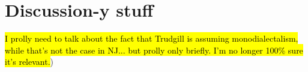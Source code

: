 \section{Discussion-y stuff}
\hl{I prolly need to talk about the fact that Trudgill is assuming monodialectalism, while that's not the case in NJ... but prolly only briefly. I'm no longer 100\% sure it's relevant.})





    
    
